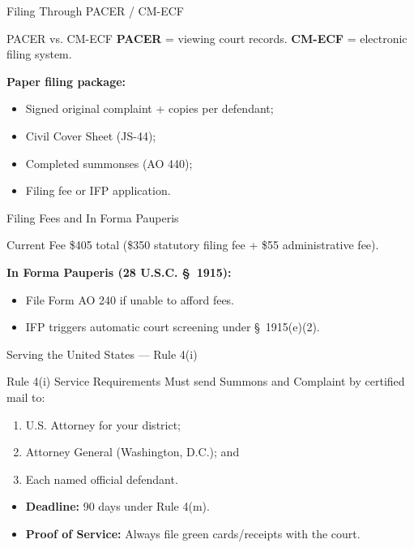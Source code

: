 \documentclass[aspectratio=169,11pt]{beamer}
\begin{document}
	\begin{frame}{Filing Through PACER / CM-ECF}
		\small
		\begin{block}{PACER vs. CM-ECF}
			\textbf{PACER} = viewing court records. \textbf{CM-ECF} = electronic filing system.
		\end{block}
		\textbf{Paper filing package:}
		\begin{itemize}
			\item Signed original complaint + copies per defendant;
			\item Civil Cover Sheet (JS-44);
			\item Completed summonses (AO 440);
			\item Filing fee or IFP application.
		\end{itemize}
	\end{frame}
	
	\begin{frame}{Filing Fees and In Forma Pauperis}
		\small
		\begin{block}{Current Fee}
			\$405 total (\$350 statutory filing fee + \$55 administrative fee).
		\end{block}
		\textbf{In Forma Pauperis (28 U.S.C. \S~1915):}
		\begin{itemize}
			\item File Form AO 240 if unable to afford fees.
			\item IFP triggers automatic court screening under \S~1915(e)(2).
		\end{itemize}
	\end{frame}
	
	\begin{frame}{Serving the United States --- Rule 4(i)}
		\small
		\begin{block}{Rule 4(i) Service Requirements}
			Must send Summons and Complaint by certified mail to:
			\begin{enumerate}
				\item U.S. Attorney for your district;
				\item Attorney General (Washington, D.C.); and
				\item Each named official defendant.
			\end{enumerate}
		\end{block}
		\begin{itemize}
			\item \textbf{Deadline:} 90 days under Rule 4(m).
			\item \textbf{Proof of Service:} Always file green cards/receipts with the court.
		\end{itemize}
	\end{frame}
	
\end{document}
